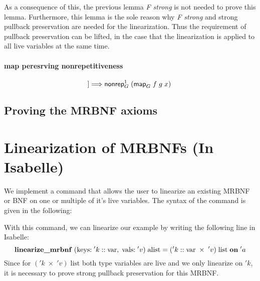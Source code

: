       As a consequence of this, the previous lemma \textit{F strong} is not needed to prove this lemma. Furthermore, this lemma is the sole reason why \textit{F strong} and strong pullback preservation are needed for the linearization. Thus the requirement of pullback preservation can be lifted, in the case that the linearization is applied to all live variables at the same time.

    \paragraph{map peresrving nonrepetitiveness}
      \begin{equation*}
        [\![\text{\textsf{nonrep}}_G^1\; x;\; \text{\textsf{bijective}} f]\!] \Longrightarrow \text{\textsf{nonrep}}_G^1\; (\text{\textsf{map}}_G\; f\; g\; x)
      \end{equation*} 
      
  \subsection{Proving the MRBNF axioms}

  \section{Linearization of MRBNFs (In Isabelle)}
    We implement a command that allows the user to linearize an existing \ac{MRBNF} or \ac{BNF} on one or multiple of it's live variables. The syntax of the command is given in the following:

    

    With this command, we can linearize our example by writing the following line in Isabelle:
    \begin{equation*}
      \text{\textbf{linearize\_mrbnf}}\; (\text{keys:}\; 'k :: \text{var},\; \text{vals:}\; 'v)\; \text{alist} = ('k :: \text{var}\; \times\; 'v)\; \text{list}\; \text{\textbf{on}}\; 'a
    \end{equation*}
    Since for $('k\; \times\; 'v)\; \text{list}$ both type variables are live and we only linearize on $'k$, it is necessary to prove strong pullback preservation for this \ac{MRBNF}. 
    

    

  
